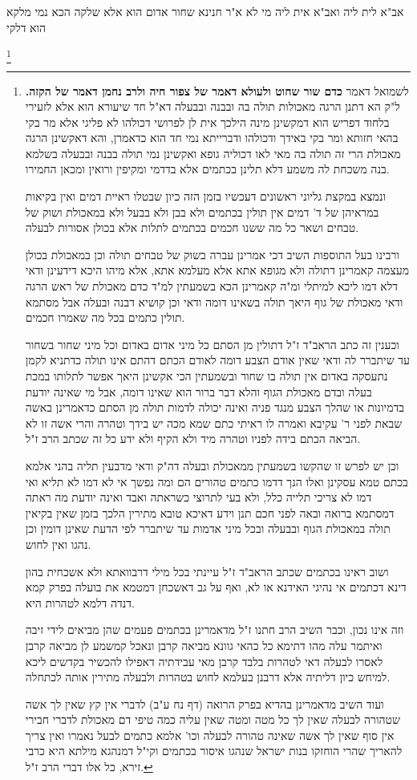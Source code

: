 \documentclass[12pt, openany]{book}
\newcommand{\footnotecomment}[1]{
	\renewcommand\thefootnote{}
	\footnote{#1}}
\newcommand{\commenta}[1]{\footnotecomment{#1}}
\begin{document}
{אב"א לית ליה ואב"א אית ליה מי לא א"ר חנינא שחור אדום הוא אלא שלקה הכא נמי מלקא הוא דלקי
\commenta{לשמואל דאמר \textbf{כדם שור שחוט ולעולא דאמר של צפור חיה ולרב נחמן דאמר של הקזה.} ל"ק הא דתנן הרגה מאכולות תולה בה ובבנה ובבעלה דא"ל חד שיעורא הוא אלא לזעירי בלחוד דפריש הוא דמקשינן מינה הילכך אית לן לפרושי דכולהו לא פליגי אלא מר בקי בהאי חזותא ומר בקי באידך ודכולהו ודברייתא נמי חד הוא כדאמרן, והא דאקשינן הרגה מאכולת הרי זה תולה בה מאי לאו דכוליה גופא ואקשינן נמי תולה בבנה ובבעלה בשלמא בנה משכחת לה משמע דלא תלינן בכתמים אלא בדדמי ומקיפין ורואין ומכאן החמירו.\par ונמצא במקצת גליוני ראשונים דעכשיו בזמן הזה כיון שבטלו ראיית דמים ואין בקיאות במראיהן של ד' דמים אין תולין בכתמים ולא בבן ולא בבעל ולא במאכולת ושוק של טבחים ושאר כל מה ששנו חכמים בכתמים לתלות אלא בכולן אסורות לבעלה.\par ורבינו בעל התוספות השיב דכי אמרינן עברה בשוק של טבחים תולה וכן במאכולת בכולן מעצמה קאמרינן דתולה ולא מגופא אתא אלא מעלמא אתא, אלא מיהו היכא דידעינן ודאי דלא דמו ליכא למיתלי ומ"ה קאמרינן הכא בשמעתין למ"ד כדם מאכולת של ראש הרגה ודאי מאכולת של גוף היאך תולה בשאינו דומה ודאי וכן קושיא דבנה ובעלה אבל מסתמא תולין כתמים בכל מה שאמרו חכמים.\par וכענין זה כתב הראב"ד ז"ל דתולין מן הסתם כל מיני אדום באדום וכל מיני שחור בשחור עד שיתברר לה ודאי שאין אודם הצבע דומה לאודם הכתם דהתם אינו תולה כדתניא לקמן נתעסקה באדום אין תולה בו שחור ובשמעתין הכי אקשינן היאך אפשר לתלותו במכת בעלה ובדם מאכולת הגוף והלא דבר ברור הוא שאינו דומה, אבל מי שאינה יודעת בדמיונות או שהלך הצבע מנגד פניה ואינה יכולה לדמות תולה מן הסתם כדאמרינן באשה שבאת לפני ר' עקיבא ואמרה לו ראיתי כתם שמא מכה יש בידך וטהרה והרי אשה זו לא הביאה הכתם בידה לפניו וטהרה מיד ולא הקיף ולא ידע כל זה שכתב הרב ז"ל.\par וכן יש לפרש זו שהקשו בשמעתין ממאכולת ובעלה דה"ק ודאי מדבעין תליה בהני אלמא בכתם טמא עסקינן ואלו הנך דדמו כתמים טהורים הם ומה נפשך אי לא דמו לא תליא ואי דמו לא צריכי תלייה כלל, ולא בעי לתרוצי כשראתה ואבד ואינה יודעת מה ראתה דמסתמא ברואה ובאה לפני חכם תנן וידע דאיכא טובא מתירין הלכך בזמן שאין בקיאין תולה במאכולת הגוף ובבעלה ובכל מיני אדמות עד שיתברר לפי הדעת שאינן דומין וכן נהגו ואין לחוש.\par ושוב ראינו בכתמים שכתב הראב"ד ז"ל עיינתי בכל מילי דרבוואתא ולא אשכחית בהון דינא דכתמים אי נהיגי האידנא או לא, ואף על גב דאשכחן דמטמא את בועלה בפרק קמא דנדה דלמא לטהרות היא.\par וזה אינו נכון, וכבר השיב הרב חתנו ז"ל מדאמרינן בכתמים פעמים שהן מביאים לידי זיבה ואיתמר עלה מהו דתימא כל כהאי גוונא מביאה קרבן ונאכל קמשמע לן מביאה קרבן לאסרו לבעלה דאי לטהרות בלבד קרבן מאי עבידתיה דאפילו להכשיר בקדשים ליכא למיחש כיון דליתיה אלא דרבנן בעלמא לחוש בטהרות ולבעלה מתירין אותה לכתחלה.\par ועוד השיב מדאמרינן בהדיא בפרק הרואה (דף נח ע"ב) לדברי אין קץ שאין לך אשה שטהורה לבעלה שאין לך כל מטה ומטה שאין עליה כמה טיפי דם מאכולת לדברי חבירי אין סוף שאין לך אשה שאינה טהורה לבעלה וכו' אלמא כתמים לבעל נאמרו ואין צריך להאריך שהרי הוחזקו בנות ישראל שנהגו איסור בכתמים וקי"ל דמנהגא מילתא היא כרבי זירא, כל אלו דברי הרב ז"ל. }
}
\end{document}
